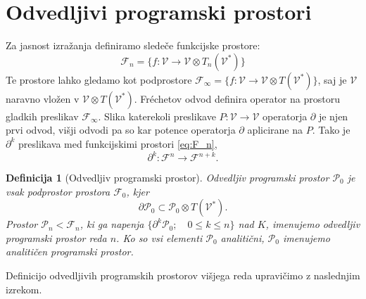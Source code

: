 \documentclass[a4paper, 12pt]{book}
\newcommand{\VV}{\mathcal{V}}
\newcommand{\F}{\mathcal{F}}
\newcommand{\dP}{\mathcal{P}}
\newcommand{\D}{\partial}
\newtheorem{definicija}{Definicija}[chapter]
\begin{document}
\section{Odvedljivi programski prostori}

Za jasnost izražanja definiramo sledeče funkcijske prostore:
 \begin{equation}\label{eq:F_n}
 	\F_n=\{f:\VV\to \VV\otimes T_n(\VV^*)\}
 \end{equation}
Te prostore lahko gledamo kot podprostore $\F_\infty=\{f:\VV\to \VV\otimes
T(\VV^*)\}$, saj je $\VV$ naravno vložen v $\VV\otimes T(\VV^*)$. Fréchetov odvod definira operator na prostoru gladkih preslikav $\F_\infty$. Slika katerekoli preslikave $P:\VV\to\VV$ operatorja $\D$ je njen prvi odvod, višji odvodi pa so kar potence operatorja $\D$ aplicirane na $P$. Tako je $\D^k$ preslikava med funkcijskimi prostori \eqref{eq:F_n},
\begin{equation}\label{eq:toFn+k}
 \D^k:\F^n\to\F^{n+k}.
 \end{equation}
\begin{definicija}[Odvedljiv programski prostor]
\emph{Odvedljiv programski prostor} $\dP_0$ je vsak podprostor prostora $\F_0$, kjer
\begin{equation}\label{eq:P}
 	\D\dP_0\subset\dP_0\otimes T(\VV^*).
\end{equation}
Prostor $\dP_n<\F_n$, ki ga napenja $\{\D^k\dP_0;\quad 0\le k\le n\}$ nad $K$, imenujemo \emph{odvedljiv programski prostor reda} $n$. Ko so vsi elementi $\dP_0$ analitični, $\dP_0$ imenujemo \emph{analitičen programski prostor}. 
\end{definicija}
Definicijo odvedljivih programskih prostorov višjega reda upravičimo z naslednjim izrekom.
\end{document}
